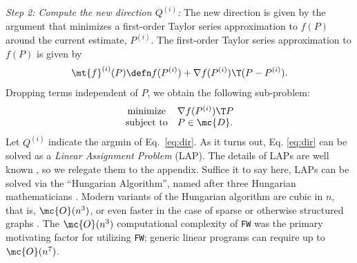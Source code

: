 \documentclass{article} %
\begin{document}
\emph{Step 2: Compute the new direction $Q^{(i)}$:} The new direction is given by the argument that minimizes a first-order Taylor series approximation to $f(P)$ around the current estimate, $P^{(i)}$. The first-order Taylor series approximation to $f(P)$ is given by
\begin{align}
	\mt{f}^{(i)}(P) \defn f(P^{(i)}) + \nabla f(P^{(i)})\T(P - P^{(i)}).
\end{align}
Dropping terms independent of $P$, we obtain the following sub-problem:
\begin{equation}
\begin{array}{cl}
			\text{minimize}   & \nabla f(P^{(i)})\T P \\
			\text{subject to}  &P \in \mc{D}.   
\end{array} \label{eq:dir}
\end{equation}
% 
% 
Let $Q^{(i)}$ indicate the argmin of Eq.~\eqref{eq:dir}.
As it turns out, Eq.  \eqref{eq:dir} can be solved as a \emph{Linear Assignment Problem} (LAP).  The details of LAPs are well known \cite{Burkard2009}, so we relegate them to the appendix.  Suffice it to say here, LAPs can be solved via  the ``Hungarian Algorithm'', named after three Hungarian mathematicians \cite{Kuhn1955}.  Modern variants of the Hungarian algorithm are cubic in $n$, that is, $\mc{O}(n^3)$, or even faster in the case of sparse or otherwise structured graphs \cite{Burkard2009}.  The $\mc{O}(n^3)$ computational complexity of \texttt{FW} was the primary motivating factor for utilizing \texttt{FW}; generic linear programs can require up to $\mc{O}(n^7)$.

\end{document}
